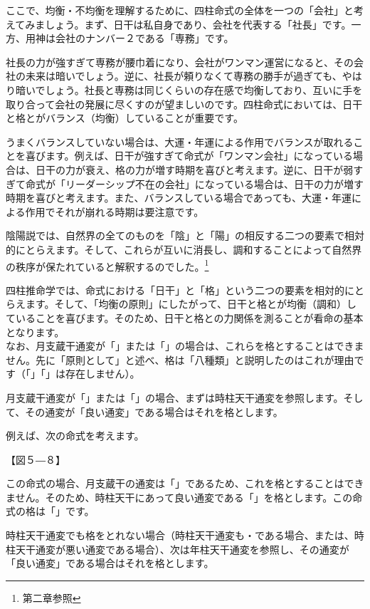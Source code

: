 \documentclass[a5paper,11pt,dvipdfmx]{tarticle}
\begin{document}
ここで、均衡・不均衡を理解するために、四柱命式の全体を一つの「会社」と考えてみましょう。まず、日干は私自身であり、会社を代表する「社長」です。一方、用神は会社のナンバー２である「専務」です。

社長の力が強すぎて専務が腰巾着になり、会社がワンマン運営になると、その会社の未来は暗いでしょう。逆に、社長が頼りなくて専務の勝手が過ぎても、やはり暗いでしょう。社長と専務は同じくらいの存在感で均衡しており、互いに手を取り合って会社の発展に尽くすのが望ましいのです。四柱命式においては、日干と格とがバランス（均衡）していることが重要です。

うまくバランスしていない場合は、大運・年運による作用でバランスが取れることを喜びます。例えば、日干が強すぎて命式が「ワンマン会社」になっている場合は、日干の力が衰え、格の力が増す時期を喜びと考えます。逆に、日干が弱すぎて命式が「リーダーシップ不在の会社」になっている場合は、日干の力が増す時期を喜びと考えます。また、バランスしている場合であっても、大運・年運による作用でそれが崩れる時期は要注意です。

陰陽説では、自然界の全てのものを「陰」と「陽」の相反する二つの要素で相対的にとらえます。そして、これらが互いに消長し、調和することによって自然界の秩序が保たれていると解釈するのでした。\footnote{第二章参照}

四柱推命学では、命式における「日干」と「格」という二つの要素を相対的にとらえます。そして、「均衡の原則」にしたがって、日干と格とが均衡（調和）していることを喜びます。そのため、日干と格との力関係を測ることが看命の基本となります。\\

なお、月支蔵干通変が「」または「」の場合は、これらを格とすることはできません。先に「原則として」と述べ、格は「八種類」と説明したのはこれが理由です（「」「」は存在しません）。

月支蔵干通変が「」または「」の場合、まずは時柱天干通変を参照します。そして、その通変が「良い通変」である場合はそれを格とします。

例えば、次の命式を考えます。

【図５―８】

この命式の場合、月支蔵干の通変は「」であるため、これを格とすることはできません。そのため、時柱天干にあって良い通変である「」を格とします。この命式の格は「」です。

時柱天干通変でも格をとれない場合（時柱天干通変も・である場合、または、時柱天干通変が悪い通変である場合）、次は年柱天干通変を参照し、その通変が「良い通変」である場合はそれを格とします。
\end{document}
